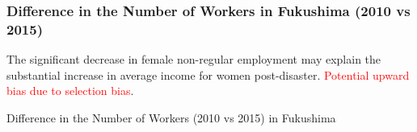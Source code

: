 \documentclass[serif, aspectratio=169]{beamer}
\begin{document}
\begin{frame}[label=numbers_of_workers]
\frametitle{Difference in the Number of Workers in Fukushima (2010 vs 2015)}

\vspace{-0.2cm}






The significant decrease in female non-regular employment may explain the substantial increase in average income for women post-disaster. \textcolor{red}{Potential upward bias due to selection bias}.

\vspace{-0.2cm}

\begin{table}[htbp]
\centering
\caption{Difference in the Number of Workers (2010 vs 2015) in Fukushima}

\vspace{-0.2cm}



\end{table}
\end{frame}
\end{document}
